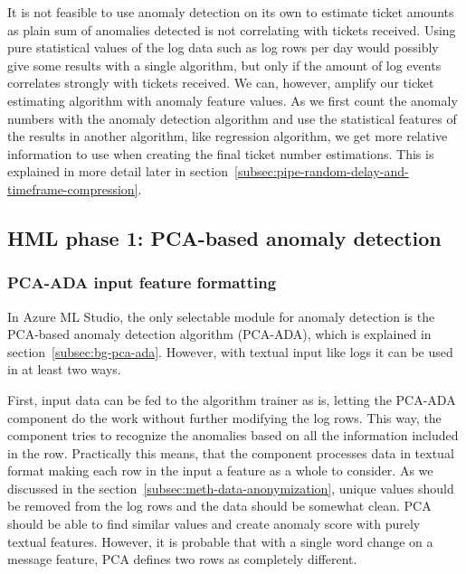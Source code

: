 It is not feasible to use anomaly detection on its own to estimate ticket amounts
as plain sum of anomalies detected
is not correlating with tickets received.
Using pure statistical values of the log data
such as log rows per day
would possibly give some results with a single algorithm,
but only if the amount of log events correlates strongly with tickets received.
We can, however,
amplify our ticket estimating algorithm with anomaly feature values.
As we first count the anomaly numbers with the anomaly detection algorithm
and use the statistical features of the results in another algorithm,
like regression algorithm,
we get more relative information to use
when creating the final ticket number estimations.
This is explained in more detail
later in section~\ref{subsec:pipe-random-delay-and-timeframe-compression}.




\subsection{HML phase 1: PCA-based anomaly detection}\label{subsec:pipe-pca-ada-input-output}



\subsubsection*{PCA-ADA input feature formatting}
In Azure ML Studio, the only selectable module for
anomaly detection is the PCA-based anomaly detection
algorithm (PCA-ADA), which is explained in section~\ref{subsec:bg-pca-ada}.
However,
with textual input like logs
it can be used in at least two ways.

First,
input data can be fed to
the algorithm trainer as is,
letting the PCA-ADA component
do the work without further modifying the log rows.
This way,
the component tries to recognize the anomalies
based on all the information included in the row.
Practically this means,
that the component processes data in textual format
making each row in the input
a feature as a whole to consider.
As we discussed in the section~\ref{subsec:meth-data-anonymization},
unique values should be removed from the log rows
and the data should be somewhat clean.
PCA should be able to find similar values
and create anomaly score with purely textual features.
However,
it is probable that with a single word change on a message feature,
PCA defines two rows as completely different.


